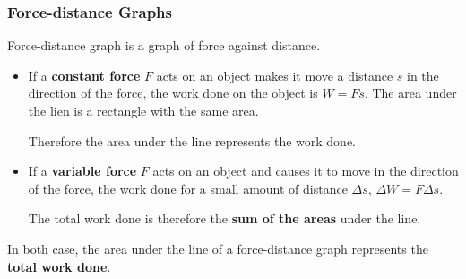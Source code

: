 \subsubsection*{Force-distance Graphs}
Force-distance graph is a graph of force against distance.

\begin{itemize}
    \item If a \textbf{constant force} $F$ acts on an object makes it move a distance $s$ in the direction of the force, the work done on the object is $W=Fs$. The area under the lien is a rectangle with the same area.

        Therefore the area under the line represents the work done.
    \item If a \textbf{variable force} $F$ acts on an object and causes it to move in the direction of the force, the work done for a small amount of distance $\Delta s$, $\Delta W=F\Delta s$.

        The total work done is therefore the \textbf{sum of the areas} under the line.
\end{itemize}

In both case, the area under the line of a force-distance graph represents the \textbf{total work done}.
